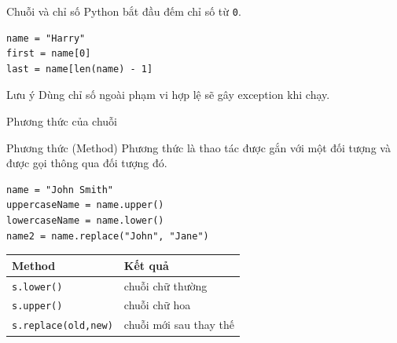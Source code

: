 \documentclass[aspectratio=169,10pt]{beamer}
\begin{document}
\begin{frame}[fragile]{Chuỗi và chỉ số}
Python bắt đầu đếm chỉ số từ \texttt{0}.
\begin{center}
\end{center}
\begin{lstlisting}
name = "Harry"
first = name[0]
last = name[len(name) - 1]
\end{lstlisting}
\begin{alertblock}{Lưu ý}
Dùng chỉ số ngoài phạm vi hợp lệ sẽ gây exception khi chạy.
\end{alertblock}
\end{frame}

\begin{frame}[fragile]{Phương thức của chuỗi}
\begin{block}{Phương thức (Method)}
Phương thức là thao tác được gắn với một đối tượng và được gọi thông qua đối tượng đó.
\end{block}
\begin{lstlisting}
name = "John Smith"
uppercaseName = name.upper()
lowercaseName = name.lower()
name2 = name.replace("John", "Jane")
\end{lstlisting}
\begin{table}
\centering
\begin{tabular}{ll}
\toprule
Method & Kết quả \\
\midrule
\texttt{s.lower()} & chuỗi chữ thường \\
\texttt{s.upper()} & chuỗi chữ hoa \\
\texttt{s.replace(old,new)} & chuỗi mới sau thay thế \\
\bottomrule
\end{tabular}
\end{table}
\end{frame}
\end{document}
